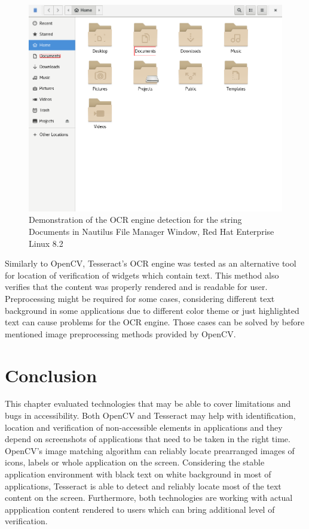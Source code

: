 \begin{figure}[hbt]
	\centering
	\includegraphics[width=1\textwidth]{obrazky-figures/ocr+nautilus.png}
	\caption{Demonstration of the OCR engine detection for the string Documents in Nautilus File Manager Window, Red Hat Enterprise Linux 8.2}
	\label{ocr_nautilus}
\end{figure}

Similarly to OpenCV, Tesseract's OCR engine was tested as an alternative tool for location of verification of widgets which contain text. This method also verifies that the content was properly rendered and is readable for user. Preprocessing might be required for some cases, considering different text background in some applications due to different color theme or just highlighted text can cause problems for the OCR engine. Those cases can be solved by before mentioned image preprocessing methods provided by OpenCV. 

\section{Conclusion}
This chapter evaluated technologies that may be able to cover limitations and bugs in accessibility. Both OpenCV and Tesseract may help with identification, location and verification of non-accessible elements in applications and they depend on screenshots of applications that need to be taken in the right time. OpenCV's image matching algorithm can reliably locate prearranged images of icons, labels or whole application on the screen. Considering the stable application environment with black text on white background in most of applications, Tesseract is able to detect and reliably locate most of the text content on the screen. Furthermore, both technologies are working with actual appplication content rendered to users which can bring additional level of verification.